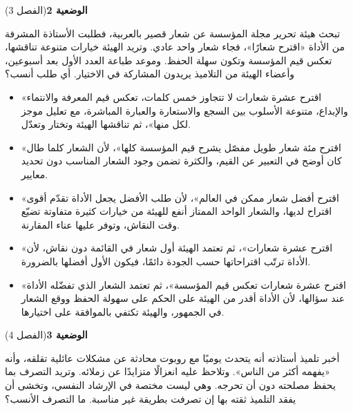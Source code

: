 \documentclass[11pt,a4paper]{article}
\begin{document}
\par\vspace{6pt}
\noindent
{\large\khatt\textbf{الوضعية 2}}\hfill{\small(الفصل 3)}\par\nopagebreak\vspace{3pt}
\setlength{\fboxsep}{7pt}\colorbox{gray!10}{\parbox{\dimexpr\linewidth-14pt}{تبحث هيئة تحرير مجلة المؤسسة عن شعار قصير بالعربية، فطلبت الأستاذة المشرفة من الأداة «اقترح شعارًا»، فجاء شعار واحد عادي. وتريد الهيئة خيارات متنوعة تناقشها، تعكس قيم المؤسسة وتكون سهلة الحفظ. وموعد طباعة العدد الأول بعد أسبوعين، وأعضاء الهيئة من التلاميذ يريدون المشاركة في الاختيار. أي طلب أنسب؟}}\par\nopagebreak
\begin{itemize}[leftmargin=1.0cm, labelsep=6pt, itemsep=3pt, topsep=4pt, parsep=0pt]
  \item[\textbf{أ)}] «اقترح عشرة شعارات لا تتجاوز خمس كلمات، تعكس قيم المعرفة والانتماء والإبداع، متنوعة الأسلوب بين السجع والاستعارة والعبارة المباشرة، مع تعليل موجز لكل منها»، ثم تناقشها الهيئة وتختار وتعدّل.
  \item[\textbf{ب)}] «اقترح مئة شعار طويل مفصّل يشرح قيم المؤسسة كلها»، لأن الشعار كلما طال كان أوضح في التعبير عن القيم، والكثرة تضمن وجود الشعار المناسب دون تحديد معايير.
  \item[\textbf{ج)}] «اقترح أفضل شعار ممكن في العالم»، لأن طلب الأفضل يجعل الأداة تقدّم أقوى اقتراح لديها، والشعار الواحد الممتاز أنفع للهيئة من خيارات كثيرة متفاوتة تضيّع وقت النقاش، وتوفر عليها عناء المقارنة.
  \item[\textbf{د)}] «اقترح عشرة شعارات»، ثم تعتمد الهيئة أول شعار في القائمة دون نقاش، لأن الأداة ترتّب اقتراحاتها حسب الجودة دائمًا، فيكون الأول أفضلها بالضرورة.
  \item[\textbf{هـ)}] «اقترح عشرة شعارات تعكس قيم المؤسسة»، ثم تعتمد الشعار الذي تفضّله الأداة عند سؤالها، لأن الأداة أقدر من الهيئة على الحكم على سهولة الحفظ ووقع الشعار في الجمهور، والهيئة تكتفي بالموافقة على اختيارها.
\end{itemize}
\par\vspace{6pt}
\noindent
{\large\khatt\textbf{الوضعية 3}}\hfill{\small(الفصل 4)}\par\nopagebreak\vspace{3pt}
\setlength{\fboxsep}{7pt}\colorbox{gray!10}{\parbox{\dimexpr\linewidth-14pt}{أخبر تلميذ أستاذته أنه يتحدث يوميًا مع روبوت محادثة عن مشكلات عائلية تقلقه، وأنه «يفهمه أكثر من الناس». وتلاحظ عليه انعزالًا متزايدًا عن زملائه. وتريد التصرف بما يحفظ مصلحته دون أن تحرجه. وهي ليست مختصة في الإرشاد النفسي، وتخشى أن يفقد التلميذ ثقته بها إن تصرفت بطريقة غير مناسبة. ما التصرف الأنسب؟}}\par\nopagebreak
\end{document}
